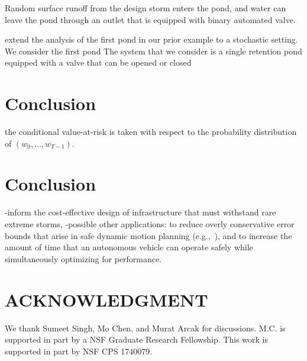 \documentclass[letterpaper, 10 pt, conference]{ieeeconf}  %
\begin{document}
Random surface runoff from the design storm enters the pond,
and water can leave the pond through an outlet that is equipped with binary automated valve.




extend the analysis of the first pond in our prior example to a stochastic setting. We consider the first pond The system that we consider is a single retention pond equipped with a valve
that can be opened or closed





\section{Conclusion}\label{conc}



the conditional value-at-risk is taken with respect to the probability distribution of $(w_0, \dots, w_{T-1})$. 

\section{Conclusion}\label{conclusion}
-inform the cost-effective design of infrastructure that must withstand rare extreme storms,
-possible other applications: to reduce overly conservative error bounds that arise in safe dynamic motion planning (e.g.,~\cite{herbert2017fastrack}), 
and to increase the amount of time that an autonomous vehicle can operate safely while simultaneously optimizing for performance.




\section*{ACKNOWLEDGMENT}
We thank Sumeet Singh, Mo Chen, and Murat Arcak for discussions.
M.C. is supported in part by a NSF Graduate Research Fellowship.
This work is supported in part by NSF CPS 1740079.
\end{document}
